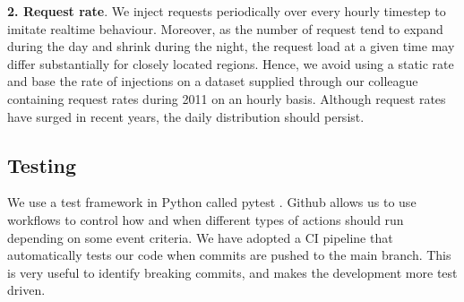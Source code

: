 \textbf{2. Request rate}. We inject requests periodically over every hourly timestep to imitate realtime behaviour. Moreover, as the number of request tend to expand during the day and shrink during the night, the request load at a given time may differ substantially for closely located regions. Hence, we avoid using a static rate and base the rate of injections on a dataset supplied through our colleague containing request rates during 2011 on an hourly basis. Although request rates have surged in recent years, the daily distribution should persist. 





\subsection{Testing}
We use a test framework in Python called pytest \cite{pytest}. 
Github allows us to use workflows to control how and when different types of actions should run depending on some event criteria. We have adopted a CI pipeline that automatically tests our code when commits are pushed to the main branch. This is very useful to identify breaking commits, and makes the development more test driven.  







